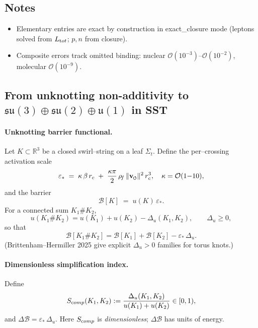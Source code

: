 \documentclass[11pt]{article}
\begin{document}
\subsection*{Notes}
\begin{itemize}
\item Elementary entries are exact by construction in exact\_closure mode (leptons solved from $L_{\textrm tot}$; $p,n$ from closure).
\item Composite errors track omitted binding: nuclear $\mathcal O(10^{-3})$–$\mathcal O(10^{-2})$, molecular $\mathcal O(10^{-9})$.
\end{itemize}


\subsection*{From unknotting non-additivity to \(\mathfrak{su}(3)\oplus\mathfrak{su}(2)\oplus\mathfrak u(1)\) in SST}

\paragraph{Unknotting barrier functional.}
    Let \(K\subset\mathbb R^3\) be a closed swirl–string on a leaf \(\Sigma_t\).
    Define the per–crossing activation scale
    \[
        \varepsilon_*\;=\;\kappa\,\beta\,\rc\;+\;\frac{\kappa\pi}{2}\,\rhof\,\vnorm^2\,\rc^3,
        \quad \kappa=\mathcal O(1{-}10),
    \]
    and the barrier
    \[
        \mathcal B[K]\;=\;u(K)\,\varepsilon_*.
    \]
    For a connected sum \(K_1\#K_2\),
    \[
        u(K_1\#K_2)=u(K_1)+u(K_2)-\Delta_u(K_1,K_2),\qquad \Delta_u\ge 0,
    \]
    so that
    \[
        \mathcal B[K_1\#K_2]=\mathcal B[K_1]+\mathcal B[K_2]-\varepsilon_*\,\Delta_u.
    \]
    (Brittenham–Hermiller 2025 give explicit \(\Delta_u>0\) families for torus knots.)

\paragraph{Dimensionless simplification index.}
    Define
    \[
        S_{\textrm comp}(K_1,K_2):=\frac{\Delta_u(K_1,K_2)}{u(K_1)+u(K_2)}\in[0,1),
    \]
    and \(\Delta\mathcal B=\varepsilon_*\,\Delta_u\). Here \(S_{\textrm comp}\) is \emph{dimensionless}; \(\Delta\mathcal B\) has units of energy.
\end{document}
